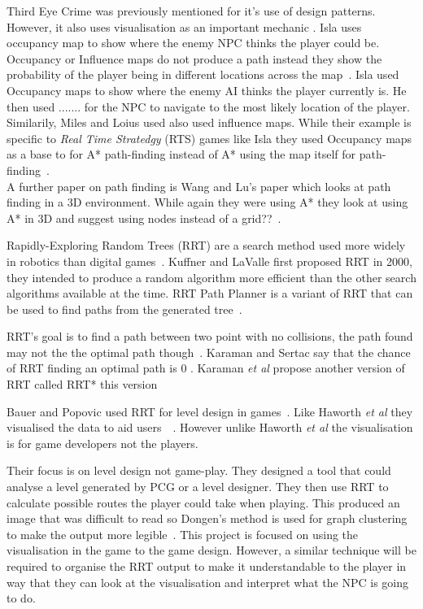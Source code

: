 \documentclass[journal]{IEEEtran}
\begin{document}
Third Eye Crime was previously mentioned for it's use of design patterns. However, it also uses visualisation as an important mechanic \cite{Isla2014}. Isla uses occupancy map to show where the enemy NPC thinks the player could be. Occupancy or Influence maps do not produce a path instead they show the probability of the player being in different locations across the map~\cite{Isla2014, Miles2006}. Isla used Occupancy maps to show where the enemy AI thinks the player currently is. He then used ....... for the NPC to navigate to the most likely location of the player. Similarily, Miles and Loius used also used influence maps. While their example is specific to \textit{Real Time Stratedgy} (RTS) games like Isla they used Occupancy maps as a base to for A* path-finding instead of A* using the map itself for path-finding~\cite{Miles2006}.\\
 
A further paper on path finding is Wang and Lu's paper which looks at path finding in a 3D environment. While again they were using A* they look at using A* in 3D and suggest using nodes instead of a grid??~\cite{wang2012}.

Rapidly-Exploring Random Trees (RRT) are a search method used more widely in robotics than digital games~\cite{Kuffner2000}. Kuffner and LaValle first proposed RRT in 2000, they intended to produce a random algorithm more efficient than the other search algorithms available at the time. RRT Path Planner is a variant of RRT that can be used to find paths from the generated tree~\cite{Kuffner2000}.

RRT's goal is to find a path between two point with no collisions, the path found may not the the optimal path though~\cite{Kuffner2000, Karaman2011}.  Karaman and Sertac say that the chance of RRT finding an optimal path is 0 \cite{karaman2010}.  Karaman \textit{et al} propose another version of RRT called RRT* this version 

Bauer and Popovic used RRT for level design in games~\cite{bauer2012}. Like Haworth \textit{et al} they visualised the data to aid users~\cite{bauer2012}~\cite{Haworth2010}. However unlike Haworth \textit{et al} the visualisation is for game developers not the players. 

Their focus is on level design not game-play. They designed a tool that could analyse a level generated by PCG or a level designer. They then use RRT to calculate possible routes the player could take when playing. This produced an image that was difficult to read so Dongen's method is used for graph clustering to make the output more legible~\cite{bauer2012, van2001}.  This project is focused on using the visualisation in the game to the game design. However, a similar technique will be required to organise the RRT output to make it understandable to the player in way that they can look at the visualisation and interpret what the NPC is going to do. 
\end{document}
